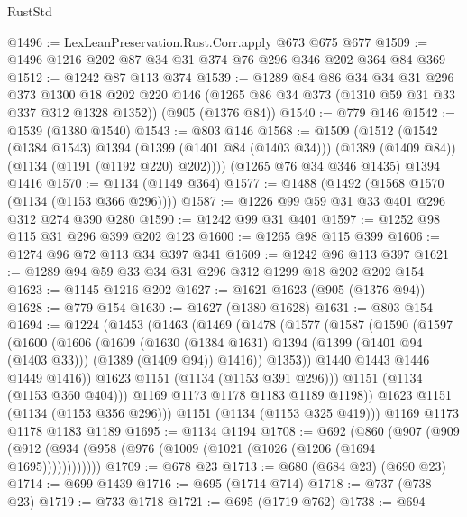\begin{lexlean}{RustStd}
\begin{coremodule}
@1496 := LexLeanPreservation.Rust.Corr.apply @673 @675 @677
@1509 := @1496 @1216 @202 @87 @34 @31 @374 @76 @296 @346 @202 @364 @84 @369
@1512 := @1242 @87 @113 @374
@1539 := @1289
    @84
    @86
    @34
    @34
    @31
    @296
    @373
    @1300
    @18
    @202
    @220
    @146
    (@1265 @86 @34 @373 (@1310 @59 @31 @33 @337 @312 @1328 @1352))
    (@905 (@1376 @84))
@1540 := @779 @146
@1542 := @1539 (@1380 @1540)
@1543 := @803 @146
@1568 := @1509
    (@1512
      (@1542
        (@1384 @1543)
        @1394
        (@1399 (@1401 @84 (@1403 @34)))
        (@1389 (@1409 @84))
        (@1134 (@1191 (@1192 @220) @202))))
    (@1265 @76 @34 @346 @1435)
    @1394
    @1416
@1570 := @1134 (@1149 @364)
@1577 := @1488 (@1492 (@1568 @1570 (@1134 (@1153 @366 @296))))
@1587 := @1226 @99 @59 @31 @33 @401 @296 @312 @274 @390 @280
@1590 := @1242 @99 @31 @401
@1597 := @1252 @98 @115 @31 @296 @399 @202 @123
@1600 := @1265 @98 @115 @399
@1606 := @1274 @96 @72 @113 @34 @397 @341
@1609 := @1242 @96 @113 @397
@1621 := @1289 @94 @59 @33 @34 @31 @296 @312 @1299 @18 @202 @202 @154
@1623 := @1145 @1216 @202
@1627 := @1621 @1623 (@905 (@1376 @94))
@1628 := @779 @154
@1630 := @1627 (@1380 @1628)
@1631 := @803 @154
@1694 := @1224
    (@1453
      (@1463
        (@1469
          (@1478
            (@1577
              (@1587
                (@1590
                  (@1597
                    (@1600
                      (@1606
                        (@1609
                          (@1630
                            (@1384 @1631)
                            @1394
                            (@1399 (@1401 @94 (@1403 @33)))
                            (@1389 (@1409 @94))
                            @1416))
                        @1353))
                    @1440
                    @1443
                    @1446
                    @1449
                    @1416))
                @1623
                @1151
                (@1134 (@1153 @391 @296)))
              @1151
              (@1134 (@1153 @360 @404)))
            @1169
            @1173
            @1178
            @1183
            @1189
            @1198))
        @1623
        @1151
        (@1134 (@1153 @356 @296)))
      @1151
      (@1134 (@1153 @325 @419)))
    @1169
    @1173
    @1178
    @1183
    @1189
@1695 := @1134 @1194
@1708 := @692
    (@860 (@907 (@909 (@912 (@934 (@958 (@976 (@1009 (@1021 (@1026 (@1206 (@1694 @1695))))))))))))
@1709 := @678 @23
@1713 := @680 (@684 @23) (@690 @23)
@1714 := @699 @1439
@1716 := @695 (@1714 @714)
@1718 := @737 (@738 @23)
@1719 := @733 @1718
@1721 := @695 (@1719 @762)
@1738 := @694

\end{coremodule}
\end{lexlean}
